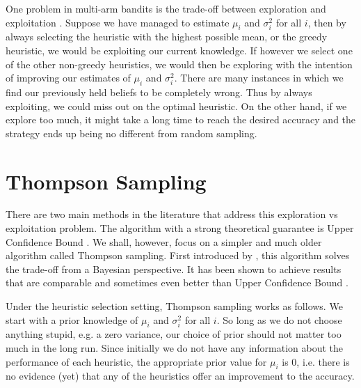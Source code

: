 One problem in multi-arm bandits is the trade-off between exploration and exploitation
. Suppose we have managed to estimate $\mu_i$ and $\sigma_i^2$
for all $i$, then by always selecting the heuristic with the highest possible mean, or the greedy
heuristic, we would be exploiting our current knowledge. If however we select one of the other
non-greedy heuristics, we would then be exploring with the intention of improving our estimates of
$\mu_i$ and $\sigma_i^2$. There are many instances in which we find our previously held beliefs to
be completely wrong. Thus by always exploiting, we could miss out on the optimal heuristic. On the
other hand, if we explore too much, it might take a long time to reach the desired accuracy and the
strategy ends up being no different from random sampling.

\section{Thompson Sampling} 
\label{sec:thompson}

There are two main methods in the literature that address this exploration vs exploitation problem.
The algorithm with a strong theoretical guarantee is Upper Confidence Bound \cite{auer02}. We
shall, however, focus on a simpler and much older algorithm called Thompson sampling. First
introduced by , this algorithm solves the trade-off from a Bayesian perspective.
It has been shown to achieve results that are comparable and sometimes even better than Upper
Confidence Bound \cite{chapelle11}.

Under the heuristic selection setting, Thompson sampling works as follows. We start with a prior
knowledge of $\mu_i$ and $\sigma_i^2$ for all $i$. So long as we do not choose anything stupid,
e.g. a zero variance, our choice of prior should not matter too much in the long run. Since
initially we do not have any information about the performance of each heuristic, the appropriate
prior value for $\mu_i$ is $0$, i.e. there is no evidence (yet) that any of the heuristics offer an
improvement to the accuracy.

